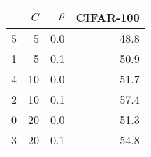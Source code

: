 \begin{tabular}{lrrr}
\toprule
 & $C$ & $\rho$ & CIFAR-100 \\
\midrule
5 & 5 & 0.0 & 48.8 \\
1 & 5 & 0.1 & 50.9 \\
4 & 10 & 0.0 & 51.7 \\
2 & 10 & 0.1 & 57.4 \\
0 & 20 & 0.0 & 51.3 \\
3 & 20 & 0.1 & 54.8 \\
\bottomrule
\end{tabular}
